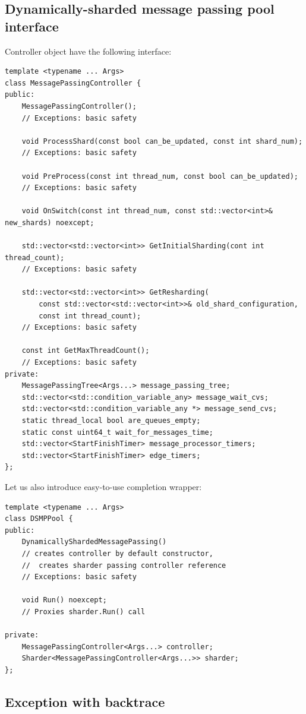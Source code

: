 \documentclass{article}
\begin{document}
\subsection{Dynamically-sharded message passing pool interface}
Controller object have the following interface:
\begin{lstlisting}
template <typename ... Args>
class MessagePassingController {
public:
	MessagePassingController();
	// Exceptions: basic safety

	void ProcessShard(const bool can_be_updated, const int shard_num);
	// Exceptions: basic safety

	void PreProcess(const int thread_num, const bool can_be_updated);
	// Exceptions: basic safety

	void OnSwitch(const int thread_num, const std::vector<int>& new_shards) noexcept;

	std::vector<std::vector<int>> GetInitialSharding(cont int thread_count);
	// Exceptions: basic safety

	std::vector<std::vector<int>> GetResharding(
		const std::vector<std::vector<int>>& old_shard_configuration,
		const int thread_count);
	// Exceptions: basic safety

	const int GetMaxThreadCount();
	// Exceptions: basic safety
private:
	MessagePassingTree<Args...> message_passing_tree;
	std::vector<std::condition_variable_any> message_wait_cvs;
	std::vector<std::condition_variable_any *> message_send_cvs;
	static thread_local bool are_queues_empty;
	static const uint64_t wait_for_messages_time;
	std::vector<StartFinishTimer> message_processor_timers;
	std::vector<StartFinishTimer> edge_timers;
};
\end{lstlisting}

Let us also introduce easy-to-use completion wrapper:
\begin{lstlisting}
template <typename ... Args>
class DSMPPool {
public:
	DynamicallyShardedMessagePassing()
	// creates controller by default constructor,
	// 	creates sharder passing controller reference
	// Exceptions: basic safety

	void Run() noexcept;
	// Proxies sharder.Run() call

private:
	MessagePassingController<Args...> controller;
	Sharder<MessagePassingController<Args...>> sharder;
};
\end{lstlisting}

\subsection{Exception with backtrace}
\label{subsec:exception_with_backtrace}
\end{document}

